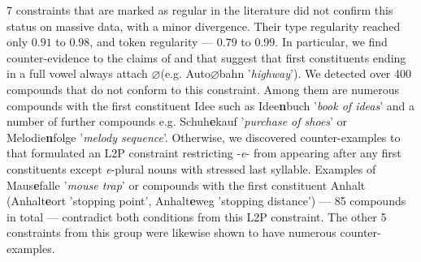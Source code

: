 \documentclass[10pt, a4paper]{article}
\newcommand{\zeroLinker}{\ensuremath{\boldsymbol{\varnothing}}}
\begin{document}
7 constraints that are marked as regular in the literature did not confirm this status on massive data, with a minor divergence. Their type regularity reached only $0.91$ to $0.98$, and token regularity --- $0.79$ to $0.99$. In particular, we find counter-evidence to the claims of \citet[110]{kuerschner_2005} and \citet[9]{schaefer_pankratz_2018} that suggest that first constituents ending in a full vowel always attach \zeroLinker (e.g. Auto{\zeroLinker}bahn '\textit{highway}'). We detected over 400 compounds that do not conform to this constraint. Among them are numerous compounds with the first constituent Idee such as Idee\textbf{n}buch '\textit{book of ideas}' and a number of further compounds e.g. Schuh\textbf{e}kauf '\textit{purchase of shoes}' or Melodie\textbf{n}folge '\textit{melody sequence}'. Otherwise, we discovered counter-examples to \citet[18]{kuerschner_2010} that formulated an L2P constraint restricting -\textit{e}- from appearing after any first constituents except \textit{e}-plural nouns with stressed last syllable. Examples of Maus\textbf{e}falle '\textit{mouse trap}' or compounds with the first constituent Anhalt (Anhalt\textbf{e}ort 'stopping point', Anhalt\textbf{e}weg 'stopping distance') --- 85 compounds in total --- contradict both conditions from this L2P constraint. The other 5 constraints from this group were likewise shown to have numerous counter-examples.
\end{document}

